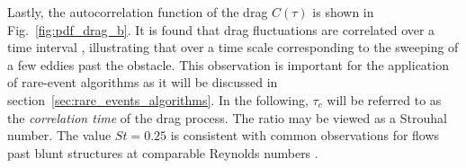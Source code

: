 Lastly, the autocorrelation function of the drag $C(\tau)$ is shown in Fig.~\ref{fig:pdf_drag_b}. It is found that drag fluctuations are correlated over a time interval , illustrating that   over a time scale corresponding to the sweeping of a few eddies past the obstacle.
%
This observation is important for the application of rare-event algorithms as it will be discussed in section~\ref{sec:rare_events_algorithms}.
%
In the following, $\tau_c$ will be referred to as the \textit{correlation time} of the drag process.
The ratio  may be viewed as a {Strouhal number}. The value $St=0.25$ is consistent with common observations for flows past blunt structures at comparable Reynolds numbers .